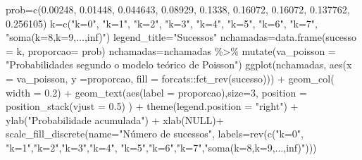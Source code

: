 \documentclass[
]{book}
\newenvironment{Shaded}{\begin{snugshade}}{\end{snugshade}}
\newcommand{\AttributeTok}[1]{\textcolor[rgb]{0.77,0.63,0.00}{#1}}
\newcommand{\ConstantTok}[1]{\textcolor[rgb]{0.00,0.00,0.00}{#1}}
\newcommand{\DecValTok}[1]{\textcolor[rgb]{0.00,0.00,0.81}{#1}}
\newcommand{\FloatTok}[1]{\textcolor[rgb]{0.00,0.00,0.81}{#1}}
\newcommand{\FunctionTok}[1]{\textcolor[rgb]{0.00,0.00,0.00}{#1}}
\newcommand{\NormalTok}[1]{#1}
\newcommand{\OtherTok}[1]{\textcolor[rgb]{0.56,0.35,0.01}{#1}}
\newcommand{\SpecialCharTok}[1]{\textcolor[rgb]{0.00,0.00,0.00}{#1}}
\newcommand{\StringTok}[1]{\textcolor[rgb]{0.31,0.60,0.02}{#1}}
\begin{document}
\begin{Shaded}
\begin{Highlighting}[]
\NormalTok{prob}\OtherTok{=}\FunctionTok{c}\NormalTok{(}\FloatTok{0.00248}\NormalTok{, }\FloatTok{0.01448}\NormalTok{, }\FloatTok{0.044643}\NormalTok{, }\FloatTok{0.08929}\NormalTok{, }\FloatTok{0.1338}\NormalTok{, }\FloatTok{0.16072}\NormalTok{, }\FloatTok{0.16072}\NormalTok{, }\FloatTok{0.137762}\NormalTok{, }\FloatTok{0.256105}\NormalTok{)}
\NormalTok{k}\OtherTok{=}\FunctionTok{c}\NormalTok{(}\StringTok{"k=0"}\NormalTok{, }\StringTok{"k=1"}\NormalTok{, }\StringTok{"k=2"}\NormalTok{, }\StringTok{"k=3"}\NormalTok{, }\StringTok{"k=4"}\NormalTok{, }\StringTok{"k=5"}\NormalTok{, }\StringTok{"k=6"}\NormalTok{, }\StringTok{"k=7"}\NormalTok{, }\StringTok{"soma(k=8,k=9,...,inf)"}\NormalTok{)}
\NormalTok{legend\_title}\OtherTok{=}\StringTok{"Sucessos"}
\NormalTok{nchamadas}\OtherTok{=}\FunctionTok{data.frame}\NormalTok{(}\AttributeTok{sucesso =}\NormalTok{ k, }\AttributeTok{proporcao=}\NormalTok{ prob)}
\NormalTok{nchamadas}\OtherTok{=}\NormalTok{nchamadas }\SpecialCharTok{\%\textgreater{}\%} 
  \FunctionTok{mutate}\NormalTok{(}\AttributeTok{va\_poisson =} \StringTok{"Probabilidades segundo o modelo teórico de Poisson"}\NormalTok{)}
\FunctionTok{ggplot}\NormalTok{(nchamadas, }\FunctionTok{aes}\NormalTok{(}\AttributeTok{x =}\NormalTok{ va\_poisson, }\AttributeTok{y =}\NormalTok{proporcao, }\AttributeTok{fill =}\NormalTok{ forcats}\SpecialCharTok{::}\FunctionTok{fct\_rev}\NormalTok{(sucesso))) }\SpecialCharTok{+}
  \FunctionTok{geom\_col}\NormalTok{( }\AttributeTok{width =} \FloatTok{0.2}\NormalTok{) }\SpecialCharTok{+}
  \FunctionTok{geom\_text}\NormalTok{(}\FunctionTok{aes}\NormalTok{(}\AttributeTok{label =}\NormalTok{ proporcao),}\AttributeTok{size=}\DecValTok{3}\NormalTok{,}
            \AttributeTok{position =} \FunctionTok{position\_stack}\NormalTok{(}\AttributeTok{vjust =} \FloatTok{0.5}\NormalTok{) ) }\SpecialCharTok{+}
  \FunctionTok{theme}\NormalTok{(}\AttributeTok{legend.position =} \StringTok{"right"}\NormalTok{) }\SpecialCharTok{+}
  \FunctionTok{ylab}\NormalTok{(}\StringTok{"Probabilidade acumulada"}\NormalTok{) }\SpecialCharTok{+}
  \FunctionTok{xlab}\NormalTok{(}\ConstantTok{NULL}\NormalTok{)}\SpecialCharTok{+}
  \FunctionTok{scale\_fill\_discrete}\NormalTok{(}\AttributeTok{name=}\StringTok{"Número de sucessos"}\NormalTok{, }
                      \AttributeTok{labels=}\FunctionTok{rev}\NormalTok{(}\FunctionTok{c}\NormalTok{(}\StringTok{"k=0"}\NormalTok{, }\StringTok{"k=1"}\NormalTok{,}\StringTok{"k=2"}\NormalTok{,}\StringTok{"k=3"}\NormalTok{,}\StringTok{"k=4"}\NormalTok{,}
                               \StringTok{"k=5"}\NormalTok{,}\StringTok{"k=6"}\NormalTok{,}\StringTok{"k=7"}\NormalTok{,}\StringTok{"soma(k=8,k=9,...,inf)"}\NormalTok{)))}
\end{Highlighting}
\end{Shaded}
\end{document}
